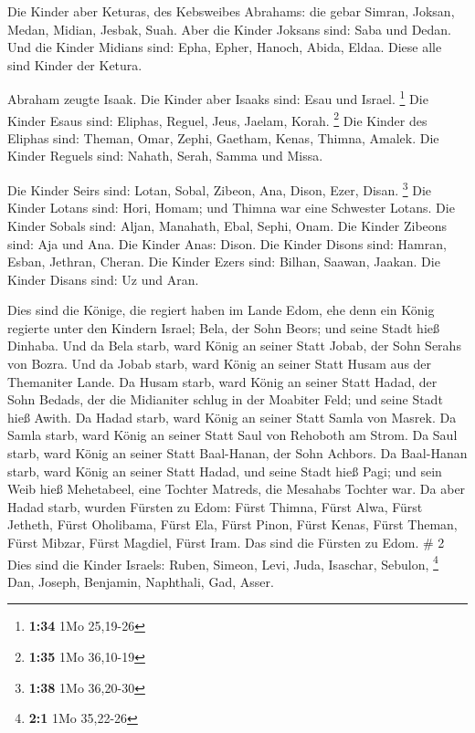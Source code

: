 Die Kinder aber Keturas, des Kebsweibes Abrahams: die
gebar Simran, Joksan, Medan, Midian, Jesbak, Suah. Aber die Kinder
Joksans sind: Saba und Dedan.  Und die Kinder Midians
sind: Epha, Epher, Hanoch, Abida, Eldaa. Diese alle sind Kinder der
Ketura.

 Abraham zeugte Isaak. Die Kinder aber Isaaks sind: Esau
und Israel. \footnote{\textbf{1:34} 1Mo 25,19-26}  Die
Kinder Esaus sind: Eliphas, Reguel, Jeus, Jaelam, Korah. \footnote{\textbf{1:35}
  1Mo 36,10-19}  Die Kinder des Eliphas sind: Theman,
Omar, Zephi, Gaetham, Kenas, Thimna, Amalek.  Die Kinder
Reguels sind: Nahath, Serah, Samma und Missa.

 Die Kinder Seirs sind: Lotan, Sobal, Zibeon, Ana, Dison,
Ezer, Disan. \footnote{\textbf{1:38} 1Mo 36,20-30}  Die
Kinder Lotans sind: Hori, Homam; und Thimna war eine Schwester Lotans.
 Die Kinder Sobals sind: Aljan, Manahath, Ebal, Sephi,
Onam. Die Kinder Zibeons sind: Aja und Ana.  Die Kinder
Anas: Dison. Die Kinder Disons sind: Hamran, Esban, Jethran, Cheran.
 Die Kinder Ezers sind: Bilhan, Saawan, Jaakan. Die
Kinder Disans sind: Uz und Aran.

 Dies sind die Könige, die regiert haben im Lande Edom,
ehe denn ein König regierte unter den Kindern Israel; Bela, der Sohn
Beors; und seine Stadt hieß Dinhaba.  Und da Bela starb,
ward König an seiner Statt Jobab, der Sohn Serahs von Bozra.
 Und da Jobab starb, ward König an seiner Statt Husam aus
der Themaniter Lande.  Da Husam starb, ward König an
seiner Statt Hadad, der Sohn Bedads, der die Midianiter schlug in der
Moabiter Feld; und seine Stadt hieß Awith.  Da Hadad
starb, ward König an seiner Statt Samla von Masrek.  Da
Samla starb, ward König an seiner Statt Saul von Rehoboth am Strom.
 Da Saul starb, ward König an seiner Statt Baal-Hanan,
der Sohn Achbors.  Da Baal-Hanan starb, ward König an
seiner Statt Hadad, und seine Stadt hieß Pagi; und sein Weib hieß
Mehetabeel, eine Tochter Matreds, die Mesahabs Tochter war.
 Da aber Hadad starb, wurden Fürsten zu Edom: Fürst
Thimna, Fürst Alwa, Fürst Jetheth,  Fürst Oholibama,
Fürst Ela, Fürst Pinon,  Fürst Kenas, Fürst Theman, Fürst
Mibzar,  Fürst Magdiel, Fürst Iram. Das sind die Fürsten
zu Edom. \# 2  Dies sind die Kinder Israels: Ruben,
Simeon, Levi, Juda, Isaschar, Sebulon, \footnote{\textbf{2:1} 1Mo
  35,22-26}  Dan, Joseph, Benjamin, Naphthali, Gad, Asser.

